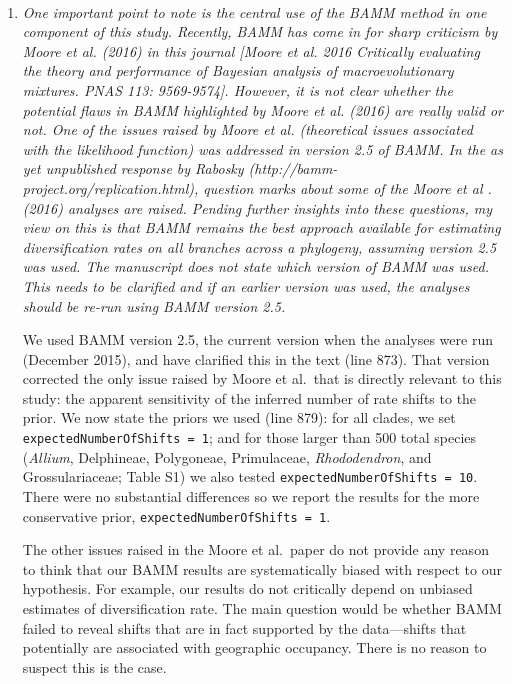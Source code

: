 \documentclass[11pt]{letter}
\begin{document}
\begin{letter}{ \\

}
\begin{enumerate}
  We have added references to Donoghue \& Sanderson (2015) and
  Bouchenak-Khelladi et al.\ (2015), and clarified our point about
  \textit{Pedicularis} (lines 306, 308).

\item \textit{One important point to note is the central use of the
    BAMM method in one component of this study. Recently, BAMM has
    come in for sharp criticism by Moore et al. (2016) in this journal
    [Moore et al. 2016 Critically evaluating the theory and
    performance of Bayesian analysis of macroevolutionary
    mixtures. PNAS 113: 9569-9574]. However, it is not clear whether
    the potential flaws in BAMM highlighted by Moore et al. (2016) are
    really valid or not. One of the issues raised by Moore et
    al. (theoretical issues associated with the likelihood function)
    was addressed in version 2.5 of BAMM.  In the as yet unpublished
    response by Rabosky (http://bamm-project.org/replication.html),
    question marks about some of the Moore et al .(2016) analyses are
    raised.  Pending further insights into these questions, my view on
    this is that BAMM remains the best approach available for
    estimating diversification rates on all branches across a
    phylogeny, assuming version 2.5 was used. The manuscript does not
    state which version of BAMM was used. This needs to be clarified
    and if an earlier version was used, the analyses should be re-run
    using BAMM version 2.5.}

  We used BAMM version 2.5, the current version when the analyses were
  run (December 2015), and have clarified this in the text (line
  873). That version corrected the only issue raised by Moore et al.\
  that is directly relevant to this study: the apparent sensitivity of
  the inferred number of rate shifts to the prior. We now state the
  priors we used (line 879): for all clades, we set
  \texttt{expectedNumberOfShifts = 1}; and for those larger than 500
  total species (\textit{Allium}, Delphineae, Polygoneae, Primulaceae,
  \textit{Rhododendron}, and Grossulariaceae; Table S1) we also tested
  \texttt{expectedNumberOfShifts = 10}. There were no substantial
  differences so we report the results for the more conservative
  prior, \texttt{expectedNumberOfShifts = 1}.

  The other issues raised in the Moore et al.\ paper do not provide
  any reason to think that our BAMM results are systematically biased
  with respect to our hypothesis. For example, our results do not
  critically depend on unbiased estimates of diversification rate. The
  main question would be whether BAMM failed to reveal shifts that are
  in fact supported by the data---shifts that potentially are
  associated with geographic occupancy. There is no reason to suspect
  this is the case.


\end{enumerate}
\end{letter}
\end{document}
